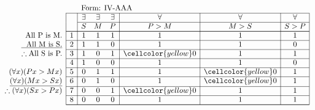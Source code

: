 \documentclass[10pt,legalpaper,landscape,cmtt]{article}
\begin{document}
{\begin{minipage}[t]{3.25in}
	\(
	\begin{array}{r|c|ccc|c|c|c|}
		\multicolumn{2}{c}{}&\multicolumn{6}{l}{\mbox{Form: IV-AAA}} \\ \cline{2-8}
		\hspace{1in}	&	& \exists & \exists & \exists & \forall & \forall & \forall\\ \cline{3-8}
		&	& S & M & P &  P > M  &  M > S  &  S > P \\ \cline{2-8} \cline{2-8}
		\phantom{\therefore}\mbox{All P is M.}   & 1 & 1 & 1 & 1 &   1   &   1   &   1  \\ \cline{2-8}
		\underline{\phantom{\therefore}\mbox{All M is S.}}   & 2 & 1 & 1 & 0 &   1   &   1   &   0  \\ \cline{2-8}
		\therefore \mbox{All S is P.}   & 3 & 1 & 0 & 1 &   \cellcolor{yellow} 0   &   1   &   1  \\ \cline{2-8}
		& 4 & 1 & 0 & 0 &   1   &   1   &   0  \\ \cline{2-8}
		(\forall x)(Px > Mx)   & 5 & 0 & 1 & 1 &   1   &   \cellcolor{yellow} 0   &   1  \\ \cline{2-8}
		\underline{(\forall x)(Mx > Sx)}   & 6 & 0 & 1 & 0 &   1   &   \cellcolor{yellow} 0   &   1  \\ \cline{2-8}
		\therefore(\forall x)(Sx > Px)   & 7 & 0 & 0 & 1 &   \cellcolor{yellow} 0   &   1   &   1  \\ \cline{2-8}
		& 8 & 0 & 0 & 0 &   1   &   1   &   1   \\ \cline{2-8}\cline{2-8} 
	\end{array}
	\)
\end{minipage}

}
\end{document}
